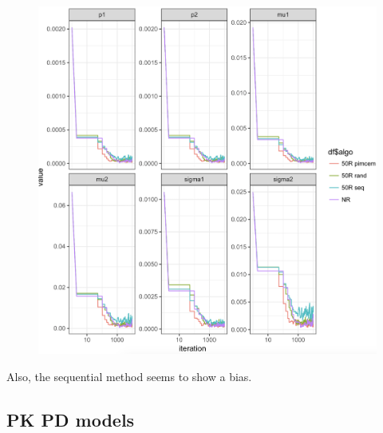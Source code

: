 \documentclass[a4paper]{article}
\theoremstyle{plain}
\theoremstyle{plain}
\theoremstyle{definition}
\begin{document}
\begin{figure}[H]
\begin{center}
\includegraphics[scale=0.3]{imcem_2gmm.png}
\end{center}
\end{figure}
Also, the sequential method seems to show a bias.




\subsection{PK PD models}


\end{document}
